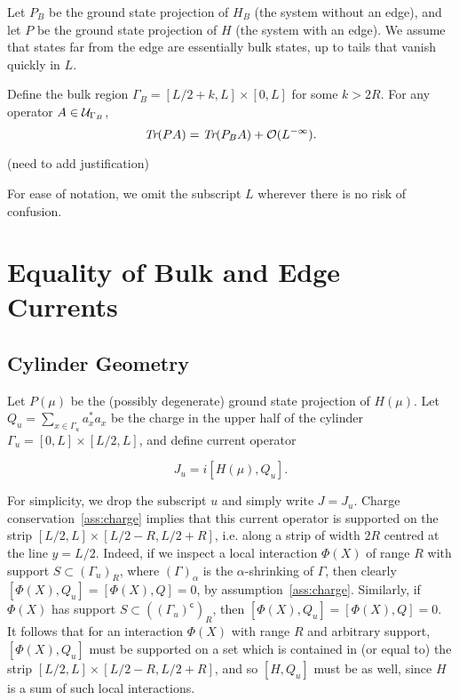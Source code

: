 \documentclass[12pt, letterpaper]{article}
\begin{document}
Let $P_B$ be the ground state projection of $H_B$ (the system without an edge), and let $P$ be the ground state projection of $H$ (the system with an edge). We assume that states far from the edge are essentially bulk states, up to tails that vanish quickly in $L$.

\begin{assumption}
Define the bulk region $\Gamma_B = [L/2+k, L] \times [0,L]$ for some $k > 2R$. For any operator $A \in \mathcal{U}_{\Gamma_B}$,
\[\emph{Tr}(PA) = \emph{Tr}(P_BA) + \mathcal{O}(L^{-\infty}).\]
\label{ass:bulk}
\end{assumption}

(need to add justification)

For ease of notation, we omit the subscript $L$ wherever there is no risk of confusion.

\section{Equality of Bulk and Edge Currents}

\subsection{Cylinder Geometry}

Let $P(\mu)$ be the (possibly degenerate) ground state projection of $H(\mu)$. Let $Q_u = \sum_{x \in \Gamma_u} a_x^* a_x$ be the charge in the upper half of the cylinder $\Gamma_u = [0,L] \times [L/2,L]$, and define current operator 

\[J_u = i[H(\mu),Q_u].\]

For simplicity, we drop the subscript $u$ and simply write $J=J_u$. Charge conservation~\ref{ass:charge} implies that this current operator is supported on the strip $[L/2, L] \times [L/2-R, L/2+R]$, i.e. along a strip of width $2R$ centred at the line $y=L/2$. Indeed, if we inspect a local interaction $\Phi(X)$ of range $R$ with support $S \subset (\Gamma_u)_R$, where $(\Gamma)_\alpha$ is the $\alpha$-shrinking of $\Gamma$, then clearly $[\Phi(X), Q_u] = [\Phi(X), Q] = 0$, by assumption~\ref{ass:charge}. Similarly, if $\Phi(X)$ has support $S \subset ((\Gamma_u)^\mathsf{c})_R$, then $[\Phi(X), Q_u] = [\Phi(X), Q] = 0$. It follows that for an interaction $\Phi(X)$ with range $R$ and arbitrary support, $[\Phi(X), Q_u]$ must be supported on a set which is contained in (or equal to) the strip $[L/2, L] \times [L/2-R, L/2+R]$, and so $[H,Q_u]$ must be as well, since $H$ is a sum of such local interactions.
\end{document}
